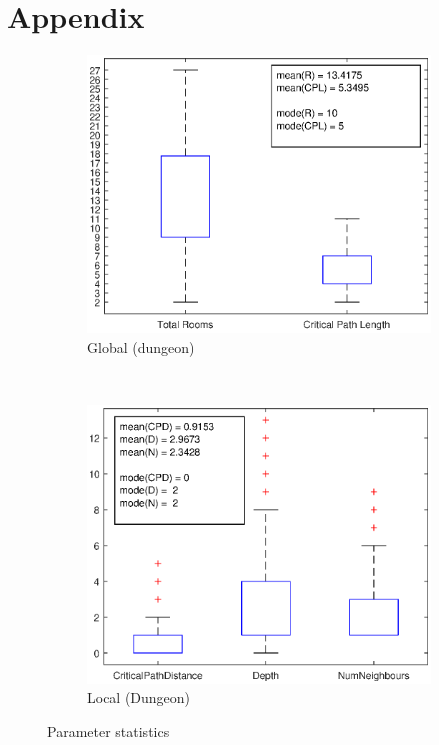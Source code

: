 \documentclass{UoYCSproject}
\begin{document}
\appendix
\chapter{Appendix}
\label{cha:aA}

\begin{figure}[htb]
  \centering
  \begin{subfigure}[b]{0.45\textwidth}
    \centering
    \includegraphics[width=\textwidth]{figures/data_plots/dungeon_bp.eps}
    \caption{Global (dungeon)}
  \end{subfigure}
  ~
  \begin{subfigure}[b]{0.45\textwidth}
    \centering
    \includegraphics[width=\textwidth]{figures/data_plots/room_bp.eps}
    \caption{Local (Dungeon)}
  \end{subfigure}
  \caption{Parameter statistics}
  \label{fig:dataStats}
\end{figure}
\end{document}
